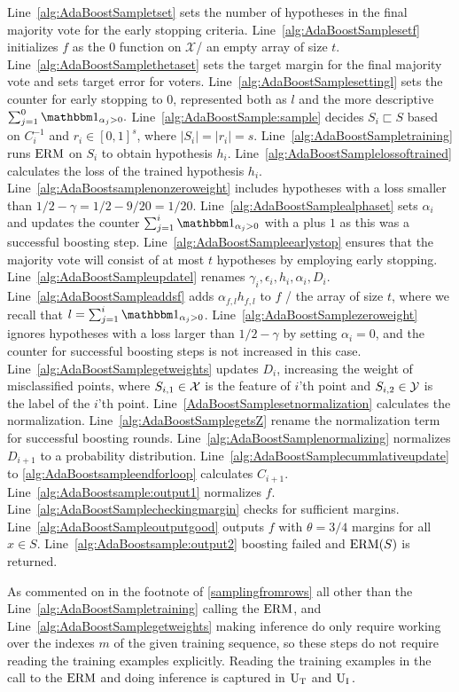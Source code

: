 Line~\ref{alg:AdaBoostSampletset} sets the number of hypotheses in the final majority vote for the early stopping criteria. 
Line~\ref{alg:AdaBoostSamplesetf} initializes $f$ as the $0$ function on $\mathcal{X}$/ an empty array of size $t.$ 
Line~\ref{alg:AdaBoostSamplethetaset} sets the target margin for the final majority vote and  sets target error for voters.
Line~\ref{alg:AdaBoostSamplesettingl} sets the counter for early stopping to $0$, represented both as $ l $ and the more descriptive $ \sum_{j=1}^{0}\ind_{\alpha_j>0}.$ 
Line~\ref{alg:AdaBoostSample:sample} decides $S_{i}\sqsubset S$ based on  $C^{-1}_{i}$ and $r_i\in [0,1]^{s}$, where $|S_{i}|=|r_{i}|=s$. 
Line~\ref{alg:AdaBoostSampletraining} runs $ \mathrm{ERM} $ on $S_i$ to obtain hypothesis $ h_{i}.$ 
Line~\ref{alg:AdaBoostSamplelossoftrained} calculates the loss of the trained hypothesis $ h_{i}.$ 
Line~\ref{alg:AdaBoostsamplenonzeroweight} includes hypotheses with a loss smaller than $1/2-\gamma=1/2-9/20=1/20$. 
Line~\ref{alg:AdaBoostSamplealphaset}  sets $\alpha_{i} $ and updates the counter $ \sum_{j=1}^{i}\ind_{\alpha_j>0} $  with a plus $ 1 $ as this was a successful boosting step. 
Line~\ref{alg:AdaBoostSampleearlystop} ensures that the majority vote will consist of at most $t$ hypotheses by employing early stopping. 
Line~\ref{alg:AdaBoostSampleupdatel} renames $ \gamma_{i},\epsilon_{i},h_{i},\alpha_{i},D_{i}$. 
Line~\ref{alg:AdaBoostSampleaddsf} adds $\alpha_{f,l} h_{f,l}$ to $f$ / the array of size $t$, where we recall that $ l= \sum_{j=1}^{i}\ind_{\alpha_j>0} $. 
Line~\ref{alg:AdaBoostSamplezeroweight} ignores hypotheses with a loss larger than $1/2-\gamma$ by setting $ \alpha_{i}=0 $, and the counter for successful boosting steps is not increased in this case. 
Line~\ref{alg:AdaBoostSamplegetweights} updates $ D_i $, increasing the weight of misclassified points, where $ S_{i,1}\in \mathcal{X} $ is the feature of $ i $'th point and  $S_{i,2}\in \mathcal{Y} $ is the label of the $ i $'th point. 
Line~\ref{AdaBoostSamplesetnormalization} calculates the normalization.
Line~\ref{alg:AdaBoostSamplegetsZ} rename the normalization term for successful boosting rounds. 
Line~\ref{alg:AdaBoostSamplenormalizing} normalizes $D_{i+1}$ to a probability distribution. 
Line~\ref{alg:AdaBoostSamplecummlativeupdate} to \ref{alg:AdaBoostsampleendforloop} calculates $C_{i+1}$. 
Line~\ref{alg:AdaBoostsample:output1} normalizes $f$. 
Line~\ref{alg:AdaBoostSamplecheckingmargin} checks for sufficient margins. 
Line~\ref{alg:AdaBoostSampleoutputgood} outputs $ f $ with $ \theta=3/4 $ margins for all $ x \in S$. 
Line~\ref{alg:AdaBoostsample:output2} boosting failed and $ \mathrm{ERM}(S) $ is returned.

As commented on in the footnote of \cref{samplingfromrows} all other than the Line~\ref{alg:AdaBoostSampletraining} calling the $ \mathrm{ERM} $, and Line~\ref{alg:AdaBoostSamplegetweights} making inference do only require working over the indexes $ m $  of the given training sequence, so these steps do not require reading the training examples explicitly. Reading the training examples in the call to the $ \mathrm{ERM} $ and doing inference is captured in $ \operatorname{U_{T}} $ and $ \operatorname{U_{I}}.$


